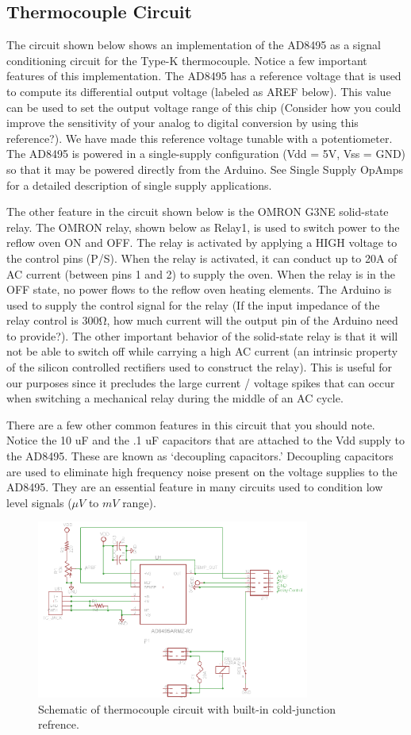 \documentclass[10pt]{report}
\begin{document}
\subsection*{Thermocouple Circuit}
	The circuit shown below shows an implementation of the AD8495 as a signal conditioning circuit for the Type-K thermocouple. Notice a few important features of this implementation. The AD8495 has a reference voltage that is used to compute its differential output voltage (labeled as AREF below). This value can be used to set the output voltage range of this chip (Consider how you could improve the sensitivity of your analog to digital conversion by using this reference?). We have made this reference voltage tunable with a potentiometer. The AD8495 is powered in a single-supply configuration (Vdd = 5V, Vss = GND) so that it may be powered directly from the Arduino. See Single Supply OpAmps for a detailed description of single supply applications.
 \par
	The other feature in the circuit shown below is the OMRON G3NE solid-state relay. The OMRON relay, shown below as Relay1, is used to switch power to the reflow oven ON and OFF. The relay is activated by applying a HIGH voltage to the control pins (P/S). When the relay is activated, it can conduct up to 20A of AC current (between pins 1 and 2) to supply the oven. When the relay is in the OFF state, no power flows to the reflow oven heating elements. The Arduino is used to supply the control signal for the relay (If the input impedance of the relay control is 300Ω, how much current will the output pin of the Arduino need to provide?). The other important behavior of the solid-state relay is that it will not be able to switch off while carrying a high AC current (an intrinsic property of the silicon controlled rectifiers used to construct the relay). This is useful for our purposes since it precludes the large current / voltage spikes that can occur when switching a mechanical relay during the middle of an AC cycle.
\par
	There are a few other common features in this circuit that you should note. Notice the 10 uF and the .1 uF capacitors that are attached to the Vdd supply to the AD8495. These are known as ‘decoupling capacitors.’ Decoupling capacitors are used to eliminate high frequency noise present on the voltage supplies to the AD8495. They are an essential feature in many circuits used to condition low level signals ($\mu V$ to $mV$ range).


\begin{figure}[H]
\centering
   \includegraphics[width=0.8\textwidth]{Thermocouple_Circuit.png}
    \caption{Schematic of thermocouple circuit with built-in cold-junction refrence.}
\end{figure}
\end{document}
